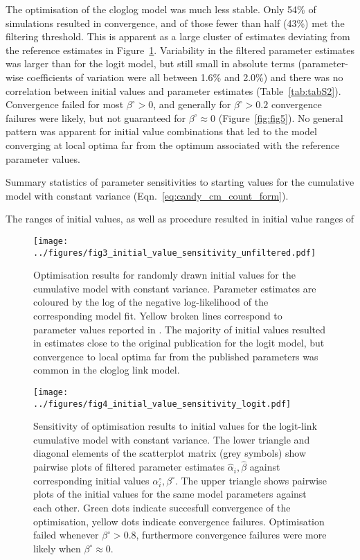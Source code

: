 The optimisation of the cloglog model was much less stable. Only 54\% of simulations resulted in convergence, and of those fewer than half (43\%) met the filtering threshold. This is apparent as a large cluster of estimates deviating from the reference estimates in Figure~\ref{fig:fig3}. Variability in the filtered parameter estimates was larger than for the logit model, but still small in absolute terms (parameter-wise coefficients of variation were all between 1.6\% and 2.0\%) and there was no correlation between initial values and parameter estimates (Table~\ref{tab:tabS2}). Convergence failed for most $\beta^{\circ}>0$, and generally for $\beta^{\circ}>0.2$ convergence failures were likely, but not guaranteed for $\beta^{\circ}\approx 0$ (Figure~\ref{fig:fig5}). No general pattern was apparent for initial value combinations that led to the model converging at local optima far from the optimum associated with the reference parameter values.


\begin{table}[bph]
  \small
    \centering
    \caption{Summary statistics of parameter sensitivities to starting values for the cumulative model with constant variance (Eqn.~\ref{eq:candy_cm_count_form}). 
    }
  
  \label{tab:tabS2}
\end{table}

The ranges of initial values, as well as  procedure resulted in initial value ranges of 

\begin{figure}[htbp]
  \centering
  \texttt{[image: ../figures/fig3\_initial\_value\_sensitivity\_unfiltered.pdf]}
  \caption{Optimisation results for randomly drawn initial values for the cumulative model with constant variance. Parameter estimates are coloured by the log of the negative log-likelihood of the corresponding model fit. Yellow broken lines correspond to parameter values reported in \citep{candy1991modeling}. The majority of initial values resulted in estimates close to the original publication for the logit model, but convergence to local optima far from the published parameters was common in the cloglog link model.}
  \label{fig:fig3}
\end{figure} 

\begin{figure}[p]
  \centering
  \texttt{[image: ../figures/fig4\_initial\_value\_sensitivity\_logit.pdf]}
  \caption{Sensitivity of optimisation results to initial values for the logit-link cumulative model with constant variance. The lower triangle and diagonal elements of the scatterplot matrix (grey symbols) show pairwise plots of filtered parameter estimates $\hat{\alpha}_i, \hat{\beta}$  against corresponding initial values $\alpha^{\circ}_i, \beta^{\circ}$. The upper triangle shows pairwise plots of the initial values for the same model parameters against each other. Green dots indicate succesfull convergence of the optimisation, yellow dots indicate convergence failures. Optimisation failed whenever $\beta^{\circ}>0.8$, furthermore convergence failures were more likely when $\beta^{\circ}\approx 0$.}
  \label{fig:fig4}
\end{figure} 

